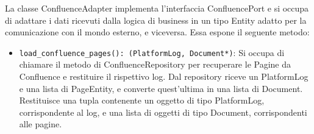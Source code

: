 \label{sec:confluence_adapter}
La classe ConfluenceAdapter implementa l'interfaccia ConfluencePort e si occupa di adattare i dati ricevuti dalla logica di business in un tipo Entity adatto per la comunicazione con il mondo esterno, e viceversa. Essa espone il seguente metodo:
\begin{itemize}
    \item \texttt{load\_confluence\_pages(): (PlatformLog, Document*)}: Si occupa di chiamare il metodo di ConfluenceRepository per recuperare le Pagine da Confluence e restituire il rispettivo log. Dal repository riceve un PlatformLog e una lista di PageEntity, e converte quest'ultima in una lista di Document. Restituisce una tupla contenente un oggetto di tipo PlatformLog, corrispondente al log, e una lista di oggetti di tipo Document, corrispondenti alle pagine.
\end{itemize}

